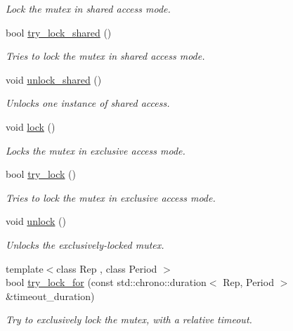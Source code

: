 \begin{DoxyCompactItemize}
\begin{DoxyCompactList}\small\item\em Lock the mutex in shared access mode. \end{DoxyCompactList}\item 
bool \hyperlink{classcpen333_1_1process_1_1impl_1_1shared__mutex__fair_a1d1a77e135745777f6476fe0abcca078}{try\+\_\+lock\+\_\+shared} ()
\begin{DoxyCompactList}\small\item\em Tries to lock the mutex in shared access mode. \end{DoxyCompactList}\item 
void \hyperlink{classcpen333_1_1process_1_1impl_1_1shared__mutex__fair_afa970da78252148b1ff049be3c239155}{unlock\+\_\+shared} ()
\begin{DoxyCompactList}\small\item\em Unlocks one instance of shared access. \end{DoxyCompactList}\item 
void \hyperlink{classcpen333_1_1process_1_1impl_1_1shared__mutex__fair_a85de84ee97bdf015411169a02935dc4d}{lock} ()
\begin{DoxyCompactList}\small\item\em Locks the mutex in exclusive access mode. \end{DoxyCompactList}\item 
bool \hyperlink{classcpen333_1_1process_1_1impl_1_1shared__mutex__fair_aaac6ea293ec760cb35eefeb004503e9a}{try\+\_\+lock} ()
\begin{DoxyCompactList}\small\item\em Tries to lock the mutex in exclusive access mode. \end{DoxyCompactList}\item 
void \hyperlink{classcpen333_1_1process_1_1impl_1_1shared__mutex__fair_a52f1959d5dfe0c08b911e0c4b06ce61c}{unlock} ()
\begin{DoxyCompactList}\small\item\em Unlocks the exclusively-\/locked mutex. \end{DoxyCompactList}\item 
{\footnotesize template$<$class Rep , class Period $>$ }\\bool \hyperlink{classcpen333_1_1process_1_1impl_1_1shared__mutex__fair_a949f9ed2c12c14bd2cade7ec96dd3adb}{try\+\_\+lock\+\_\+for} (const std\+::chrono\+::duration$<$ Rep, Period $>$ \&timeout\+\_\+duration)
\begin{DoxyCompactList}\small\item\em Try to exclusively lock the mutex, with a relative timeout. \end{DoxyCompactList}\item 

\end{DoxyCompactItemize}
